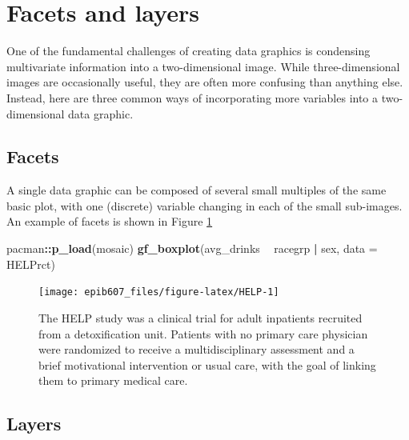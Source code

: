 \documentclass[]{book}
\makeatletter
\newenvironment{Shaded}{\begin{snugshade}}{\end{snugshade}}
\newcommand{\KeywordTok}[1]{\textcolor[rgb]{0.13,0.29,0.53}{\textbf{#1}}}
\newcommand{\DataTypeTok}[1]{\textcolor[rgb]{0.13,0.29,0.53}{#1}}
\newcommand{\StringTok}[1]{\textcolor[rgb]{0.31,0.60,0.02}{#1}}
\newcommand{\OperatorTok}[1]{\textcolor[rgb]{0.81,0.36,0.00}{\textbf{#1}}}
\newcommand{\NormalTok}[1]{#1}
\newenvironment{kframe}{%
\medskip{}
\setlength{\fboxsep}{.8em}
 \def\at@end@of@kframe{}%
 \ifinner\ifhmode%
  \def\at@end@of@kframe{\end{minipage}}%
  \begin{minipage}{\columnwidth}%
 \fi\fi%
 \def\FrameCommand##1{\hskip\@totalleftmargin \hskip-\fboxsep
 \colorbox{shadecolor}{##1}\hskip-\fboxsep
     \hskip-\linewidth \hskip-\@totalleftmargin \hskip\columnwidth}%
 \MakeFramed {\advance\hsize-\width
   \@totalleftmargin\z@ \linewidth\hsize
   \@setminipage}}%
 {\par\unskip\endMakeFramed%
 \at@end@of@kframe}
\renewenvironment{Shaded}{\begin{kframe}}{\end{kframe}}
\theoremstyle{definition}
\theoremstyle{definition}
\theoremstyle{definition}
\theoremstyle{remark}
\makeatother
\begin{document}
\section{Facets and layers}\label{facets-and-layers}

One of the fundamental challenges of creating data graphics is
condensing multivariate information into a two-dimensional image. While
three-dimensional images are occasionally useful, they are often more
confusing than anything else. Instead, here are three common ways of
incorporating more variables into a two-dimensional data graphic.

\subsection{Facets}\label{facets}

A single data graphic can be composed of several small multiples of the
same basic plot, with one (discrete) variable changing in each of the
small sub-images. An example of facets is shown in Figure \ref{fig:HELP}







\begin{Shaded}
\begin{Highlighting}[]
\NormalTok{pacman}\OperatorTok{::}\KeywordTok{p_load}\NormalTok{(mosaic)}
\KeywordTok{gf_boxplot}\NormalTok{(avg_drinks }\OperatorTok{~}\StringTok{ }\NormalTok{racegrp }\OperatorTok{|}\StringTok{ }\NormalTok{sex, }\DataTypeTok{data =}\NormalTok{ HELPrct)}
\end{Highlighting}
\end{Shaded}

\begin{figure}

{\centering \texttt{[image: epib607\_files/figure-latex/HELP-1]} 

}

\caption{The HELP study was a clinical trial for adult inpatients
recruited from a detoxification unit. Patients with no primary care
physician were randomized to receive a multidisciplinary assessment and
a brief motivational intervention or usual care, with the goal of
linking them to primary medical care.}\label{fig:HELP}
\end{figure}

\subsection{Layers}\label{layers}
\end{document}
